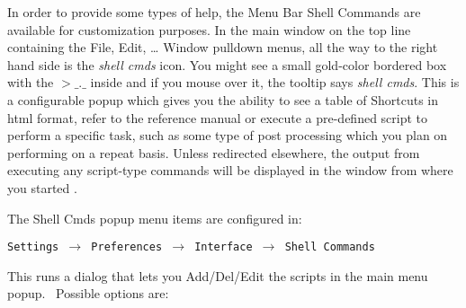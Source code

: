 In order to provide some types of help, the Menu Bar Shell Commands are available for customization purposes. In the
main window on the top line containing the File, Edit, {\dots} Window pulldown menus, all the way to the right hand
side is the \textit{shell cmds} icon. You might see a small gold-color bordered box with the $>\_.\_$ inside
and if you mouse over it, the tooltip says \textit{shell cmds}. This is a configurable popup which gives you the ability to
see a table of Shortcuts in html format, refer to the reference manual or execute a pre-defined script to perform a
specific task, such as some type of post processing which you plan on performing on a repeat basis. Unless redirected
elsewhere, the output from executing any script-type commands will be displayed in the window from where you started
\CGG{}.

The Shell Cmds popup menu items are configured in:

\texttt{Settings $\rightarrow$ Preferences $\rightarrow$ Interface $\rightarrow$ Shell Commands}

This runs a dialog that lets you Add/Del/Edit the scripts in the main menu popup. \ Possible options are:\newline

